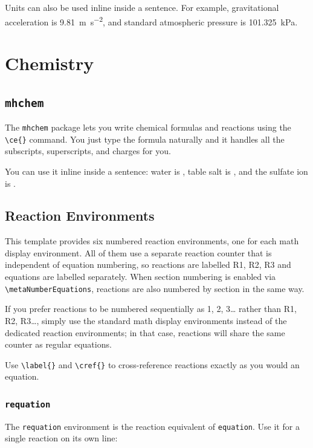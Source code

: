 	Units can also be used inline inside a sentence. For example, gravitational acceleration is \SI{9.81}{\metre\per\second\squared}, and standard atmospheric pressure is \SI{101.325}{\kilo\pascal}.

\section{Chemistry}

	\subsection{\texttt{mhchem}}
	The \texttt{mhchem} package lets you write chemical formulas and reactions using the \texttt{\textbackslash ce\{\}} command. You just type the formula naturally and it handles all the subscripts, superscripts, and charges for you.
	
	You can use it inline inside a sentence: water is , table salt is , and the sulfate ion is .
	
	\subsection{Reaction Environments}
	This template provides six numbered reaction environments, one for each math display environment. All of them use a separate reaction counter that is independent of equation numbering, so reactions are labelled R1, R2, R3 and equations are labelled separately. When section numbering is enabled via \texttt{\textbackslash metaNumberEquations}, reactions are also numbered by section in the same way.
	
	If you prefer reactions to be numbered sequentially as 1, 2, 3… rather than R1, R2, R3…, simply use the standard math display environments instead of the dedicated reaction environments; in that case, reactions will share the same counter as regular equations.
	
	Use \texttt{\textbackslash label\{\}} and \texttt{\textbackslash cref\{\}} to cross-reference reactions exactly as you would an equation.
	
		\subsubsection{\texttt{requation}}
		The \texttt{requation} environment is the reaction equivalent of \texttt{equation}. Use it for a single reaction on its own line:
		
